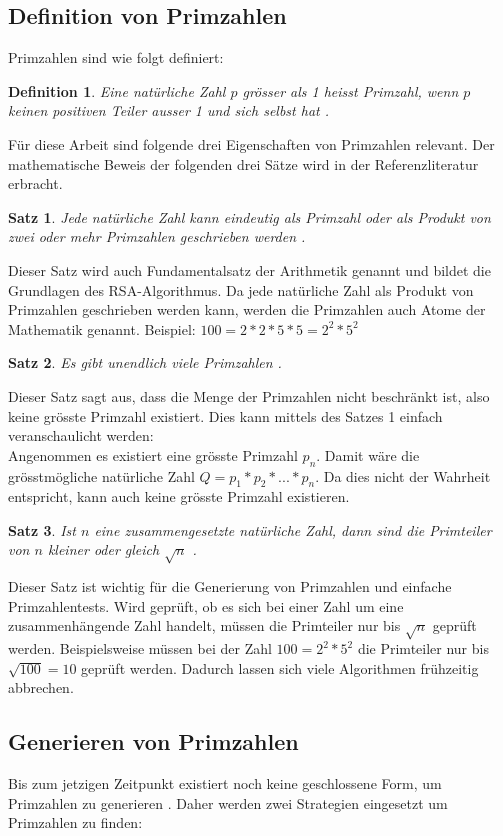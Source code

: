 \documentclass[12pt,a4paper]{article}
\newtheorem{definition}{Definition}
\newtheorem{theorem}{Satz}
\begin{document}
\subsection{Definition von Primzahlen}
Primzahlen sind wie folgt definiert:
\begin{definition}
Eine natürliche Zahl $p$ grösser als 1 heisst Primzahl, wenn $p$ keinen positiven Teiler ausser 1 und sich selbst hat \cite{Rosen.2018}.
\end{definition}
Für diese Arbeit sind folgende drei Eigenschaften von Primzahlen relevant. Der mathematische Beweis der folgenden drei Sätze wird in der Referenzliteratur erbracht.
\begin{theorem}
Jede natürliche Zahl kann eindeutig als Primzahl oder als Produkt von zwei oder mehr Primzahlen geschrieben werden \cite{Rosen.2018}.
\end{theorem}
Dieser Satz wird auch Fundamentalsatz der Arithmetik genannt und bildet die Grundlagen des RSA-Algorithmus. Da jede natürliche Zahl als Produkt von Primzahlen geschrieben werden kann, werden die Primzahlen auch Atome der Mathematik genannt. Beispiel: $100=2*2*5*5=2^{2}*5^{2}$
\newpage
\begin{theorem}
Es gibt unendlich viele Primzahlen \cite{Rosen.2018}.
\end{theorem}
Dieser Satz sagt aus, dass die Menge der Primzahlen nicht beschränkt ist, also keine grösste Primzahl existiert. Dies kann mittels des Satzes 1 einfach veranschaulicht werden:\\
Angenommen es existiert eine grösste Primzahl $p_{n}$. Damit wäre die grösstmögliche natürliche Zahl $Q=p_{1}*p_{2}*...*p_{n}$. Da dies nicht der Wahrheit entspricht, kann auch keine grösste Primzahl existieren.
\begin{theorem}
Ist $n$ eine zusammengesetzte natürliche Zahl, dann sind die Primteiler von $n$ kleiner oder gleich $\sqrt{n}$ \cite{Rosen.2018}.
\end{theorem}
Dieser Satz ist wichtig für die Generierung von Primzahlen und einfache Primzahlentests. Wird geprüft, ob es sich bei einer Zahl um eine zusammenhängende Zahl handelt, müssen die Primteiler nur bis $\sqrt{n}$ geprüft werden. Beispielsweise müssen bei der Zahl $100=2^{2}*5^{2}$ die Primteiler nur bis $\sqrt{100}=10$ geprüft werden. Dadurch lassen sich viele Algorithmen frühzeitig abbrechen.
\newpage
\subsection{Generieren von Primzahlen}
Bis zum jetzigen Zeitpunkt existiert noch keine geschlossene Form, um Primzahlen zu generieren \cite{Rosen.2018}. Daher werden zwei Strategien eingesetzt um Primzahlen zu finden:\\
\end{document}
